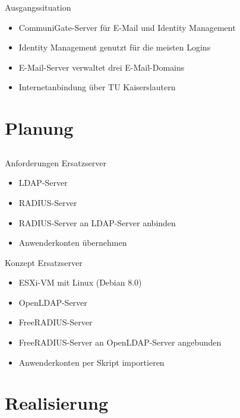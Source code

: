 \documentclass[presentation,svgnames,12pt]{beamer}
\begin{document}
\begin{frame}{Ausgangssituation}
\begin{itemize}
	\item CommuniGate-Server für E-Mail und Identity Management
	\item Identity Management genutzt für die meisten Logins
	\item E-Mail-Server verwaltet drei E-Mail-Domains
	\item Internetanbindung über TU Kaiserslautern
\end{itemize}
\end{frame}


\section{Planung}
\subsection{}
\begin{frame}{Anforderungen Ersatzserver}
\begin{itemize}
	\item LDAP-Server
	\item RADIUS-Server
	\item RADIUS-Server an LDAP-Server anbinden
	\item Anwenderkonten übernehmen
\end{itemize}
\end{frame}

\begin{frame}{Konzept Ersatzserver}
\begin{itemize}
	\item ESXi-VM mit Linux (Debian 8.0)
	\item OpenLDAP-Server
	\item FreeRADIUS-Server
	\item FreeRADIUS-Server an OpenLDAP-Server angebunden
	\item Anwenderkonten per Skript importieren
\end{itemize}
\end{frame}


\section{Realisierung}
\end{document}
